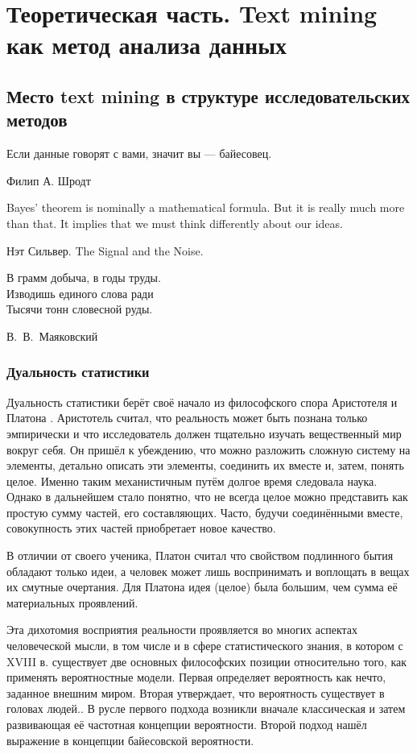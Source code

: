 \chapter{Теоретическая часть. Text mining как метод анализа данных} \label{chapt1}
\section{Место text mining в структуре исследовательских методов} \label{sect1_1}
\epigraph{Если данные говорят с вами, значит вы --- байесовец.}{Филип А. Шродт \cite[стр. 11]{Schrodt2010}}
\epigraph{Bayes’ theorem is nominally a mathematical formula. But it is really much more than that. It implies that we must think differently about our ideas.}{Нэт Сильвер\footnotemark. The Signal and the Noise.}
\epigraph{В грамм добыча, в годы труды.\\
Изводишь единого слова ради\\
Тысячи тонн словесной руды.}{В.~В.~Маяковский}
\subsection{Дуальность статистики}
Дуальность статистики берёт своё начало из философского спора Аристотеля и Платона \cite[стр. 7]{handbook_stat_dm}. Аристотель считал, что реальность может быть познана только эмпирически и что исследователь должен тщательно изучать вещественный мир вокруг себя. Он пришёл к убеждению, что можно разложить сложную систему на элементы, детально описать эти элементы, соединить их вместе и, затем, понять целое. Именно таким механистичным путём долгое время следовала наука. Однако в дальнейшем стало понятно, что не всегда целое можно представить как простую сумму частей, его составляющих. Часто, будучи соединёнными вместе, совокупность этих частей приобретает новое качество.

В отличии от своего ученика, Платон считал что свойством подлинного бытия обладают только идеи, а человек может лишь воспринимать и воплощать в вещах их смутные очертания. Для Платона идея (целое) была большим, чем сумма её материальных проявлений.

Эта дихотомия восприятия реальности проявляется во многих аспектах человеческой мысли, в том числе и в сфере статистического знания, в котором с XVIII в. существует две основных философских позиции относительно того, как применять вероятностные модели. Первая определяет вероятность как нечто, заданное внешним миром. Вторая утверждает, что вероятность существует в головах людей.\cite[стр. 18]{Christensen2010}. В русле первого подхода возникли вначале классическая и затем развивающая её частотная концепции вероятности. Второй подход нашёл выражение в концепции байесовской вероятности.

